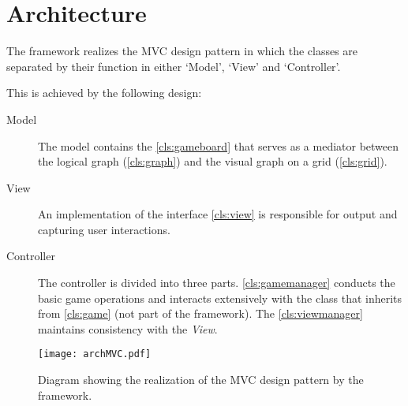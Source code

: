 \section{Architecture}
The \graphioli \gls{framework} realizes the \gls{MVC} design pattern in which the classes are separated by their function in either `Model', `View' and `Controller'.\par
This is achieved by the following design:\par

\begin{description}
	\item[Model] The model contains the \ref{cls:gameboard} that serves as a mediator between the logical \gls{graph} (\ref{cls:graph}) and the visual graph on a \gls{grid} (\ref{cls:grid}).
	\item[View] An implementation of the \gls{interface} \ref{cls:view} is responsible for output and capturing user interactions.
	\item[Controller] The controller is divided into three parts. \ref{cls:gamemanager} conducts the basic game operations and interacts extensively with the class that inherits from \ref{cls:game} (not part of the framework). The \ref{cls:viewmanager} maintains consistency with the \emph{View}.
\end{description}

\begin{figure}[h]
	\centering
	\texttt{[image: archMVC.pdf]}
	\caption{Diagram showing the realization of the \gls{MVC} design pattern by the framework.}
	\label{img:archMVC}
\end{figure}